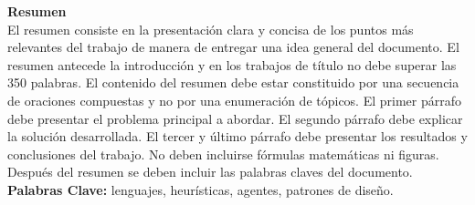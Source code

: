 
\noindent
\Large{\textbf{Resumen}}\\

\normalsize
El resumen consiste en la presentación clara y concisa de los puntos más
relevantes del trabajo de manera de entregar una idea general del documento. El
resumen antecede la introducción y en los trabajos de título no debe superar las
350 palabras. El contenido del resumen debe estar constituido por una secuencia
de oraciones compuestas y no por una enumeración de tópicos. El primer párrafo
debe presentar el problema principal a abordar. El segundo párrafo debe explicar
la solución desarrollada. El tercer y último párrafo debe presentar los
resultados y conclusiones del trabajo. No deben incluirse fórmulas matemáticas
ni figuras. Después del resumen se deben incluir las palabras claves del
documento.\\

\noindent
\textbf{Palabras Clave:} lenguajes, heurísticas, agentes, patrones de diseño.

